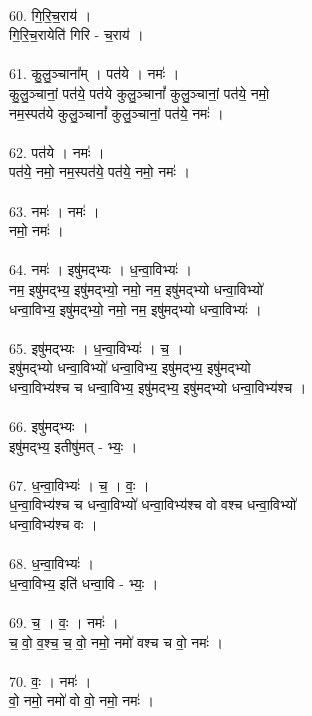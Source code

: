 \\
60. गि॒रि॒च॒राय॑ ।\\
गि॒रि॒च॒रायेति॑ गिरि - च॒राय॑ ।\\
\\
61. कु॒लु॒ञ्चाना᳚म् । पत॑ये । नमः॑ ।\\
कु॒लु॒ञ्चानां॒ पत॑ये॒ पत॑ये कुलु॒ञ्चानां᳚ कुलु॒ञ्चानां॒ पत॑ये॒ नमो॒\\
नम॒स्पत॑ये कुलु॒ञ्चानां᳚ कुलु॒ञ्चानां॒ पत॑ये॒ नमः॑ ।\\
\\
62. पत॑ये । नमः॑ ।\\
पत॑ये॒ नमो॒ नम॒स्पत॑ये॒ पत॑ये॒ नमो॒ नमः॑ ।\\
\\
63. नमः॑ । नमः॑ ।\\
नमो॒ नमः॑ ।\\
\\
64. नमः॑ । इषु॑मद्भ्यः । ध॒न्वा॒विभ्यः॑ ।\\
नम॒ इषु॑मद्भ्य॒ इषु॑मद्भ्यो॒ नमो॒ नम॒ इषु॑मद्भ्यो धन्वा॒विभ्यो॑\\
धन्वा॒विभ्य॒ इषु॑मद्भ्यो॒ नमो॒ नम॒ इषु॑मद्भ्यो धन्वा॒विभ्यः॑ ।\\
\\
65. इषु॑मद्भ्यः । ध॒न्वा॒विभ्यः॑ । च॒ ।\\
इषु॑मद्भ्यो धन्वा॒विभ्यो॑ धन्वा॒विभ्य॒ इषु॑मद्भ्य॒ इषु॑मद्भ्यो\\
धन्वा॒विभ्य॑श्च च धन्वा॒विभ्य॒ इषु॑मद्भ्य॒ इषु॑मद्भ्यो धन्वा॒विभ्य॑श्च ।\\
\\
66. इषु॑मद्भ्यः ।\\
इषु॑मद्भ्य॒ इतीषु॑मत् - भ्यः॒ ।\\
\\
67. ध॒न्वा॒विभ्यः॑ । च॒ । वः॒ ।\\
ध॒न्वा॒विभ्य॑श्च च धन्वा॒विभ्यो॑ धन्वा॒विभ्य॑श्च वो वश्च धन्वा॒विभ्यो॑\\
धन्वा॒विभ्य॑श्च वः ।\\
\\
68. ध॒न्वा॒विभ्यः॑ ।\\
ध॒न्वा॒विभ्य॒ इति॑ धन्वा॒वि - भ्यः॒ ।\\
\\
69. च॒ । वः॒ । नमः॑ ।\\
च॒ वो॒ व॒श्च॒ च॒ वो॒ नमो॒ नमो॑ वश्च च वो॒ नमः॑ ।\\
\\
70. वः॒ । नमः॑ ।\\
वो॒ नमो॒ नमो॑ वो वो॒ नमो॒ नमः॑ ।\\
\\
